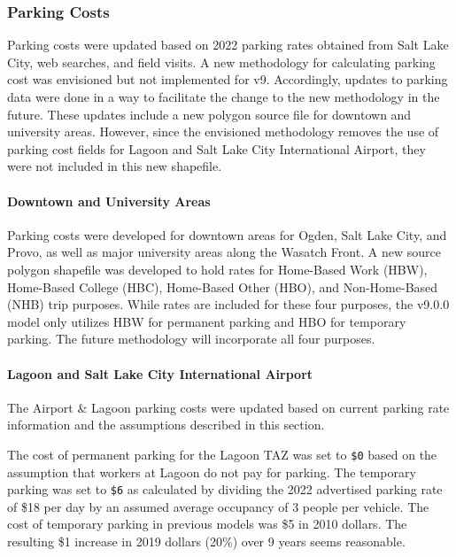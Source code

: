 \documentclass[
  letterpaper,
  DIV=11,
  numbers=noendperiod,
  titlepage=false]{scrreprt}
\let\oldparagraph\paragraph
\renewcommand{\paragraph}[1]{\oldparagraph{#1}\mbox{}}
\begin{document}
\hypertarget{parking-costs}{%
\subsubsection{Parking Costs}\label{parking-costs}}

Parking costs were updated based on 2022 parking rates obtained from
Salt Lake City, web searches, and field visits. A new methodology for
calculating parking cost was envisioned but not implemented for v9.
Accordingly, updates to parking data were done in a way to facilitate
the change to the new methodology in the future. These updates include a
new polygon source file for downtown and university areas. However,
since the envisioned methodology removes the use of parking cost fields
for Lagoon and Salt Lake City International Airport, they were not
included in this new shapefile.

\hypertarget{downtown-and-university-areas}{%
\paragraph{Downtown and University
Areas}\label{downtown-and-university-areas}}

Parking costs were developed for downtown areas for Ogden, Salt Lake
City, and Provo, as well as major university areas along the Wasatch
Front. A new source polygon shapefile was developed to hold rates for
Home-Based Work (HBW), Home-Based College (HBC), Home-Based Other (HBO),
and Non-Home-Based (NHB) trip purposes. While rates are included for
these four purposes, the v9.0.0 model only utilizes HBW for permanent
parking and HBO for temporary parking. The future methodology will
incorporate all four purposes.

\hypertarget{lagoon-and-salt-lake-city-international-airport}{%
\paragraph{Lagoon and Salt Lake City International
Airport}\label{lagoon-and-salt-lake-city-international-airport}}

The Airport \& Lagoon parking costs were updated based on current
parking rate information and the assumptions described in this section.

The cost of permanent parking for the Lagoon TAZ was set to \texttt{\$0}
based on the assumption that workers at Lagoon do not pay for parking.
The temporary parking was set to \texttt{\$6} as calculated by dividing
the 2022 advertised parking rate of \$18 per day by an assumed average
occupancy of 3 people per vehicle. The cost of temporary parking in
previous models was \$5 in 2010 dollars. The resulting \$1 increase in
2019 dollars (20\%) over 9 years seems reasonable.
\end{document}
